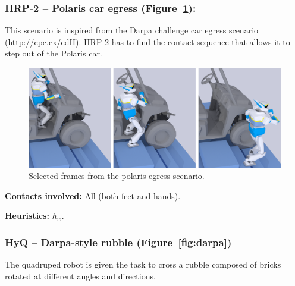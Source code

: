 \subsubsection{HRP-2 -- Polaris car egress (Figure~\ref{fig:car}):}
This scenario is inspired from the Darpa challenge car egress scenario (\url{http://cpc.cx/edH}). HRP-2 has 
to find the contact sequence that allows it to step out of the Polaris car.

\begin{figure}
  \centering
  \includegraphics[width=1\linewidth]{figures/polaris}
  \caption{
           Selected frames from the polaris egress scenario. }
		   \label{fig:car}
\end{figure}


\noindent\textbf{Contacts involved:} All (both feet and hands).

\noindent\textbf{Heuristics:} $h_w$.



\subsubsection{HyQ -- Darpa-style rubble (Figure~\ref{fig:darpa})}
The quadruped robot is given the task to cross a rubble composed of bricks rotated at different angles and directions.

